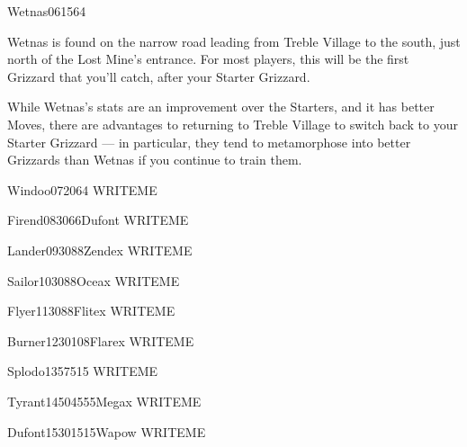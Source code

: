 \documentclass[10pt,twocolumn]{memoir}
\begin{document}
\begin{grizzardpage}{Wetnas}{06}{15}{6}{4}{}

Wetnas is  found on the narrow  road leading from Treble  Village to the
south, just  north of the Lost  Mine's entrance. For most  players, this
will   be   the  first   Grizzard   that   you'll  catch,   after   your
Starter Grizzard.

While Wetnas's  stats are an improvement  over the Starters, and  it has
better Moves,  there are  advantages to returning  to Treble  Village to
switch  back to  your Starter  Grizzard —  in particular,  they tend  to
metamorphose  into  better Grizzards  than  Wetnas  if you  continue  to
train them.
  
\end{grizzardpage}

\begin{grizzardpage}{Windoo}{07}{20}{6}{4}{}
  WRITEME
\end{grizzardpage}

\begin{grizzardpage}{Firend}{08}{30}66{Dufont}
  WRITEME
\end{grizzardpage}

\begin{grizzardpage}{Lander}{09}{30}88{Zendex}
  WRITEME
\end{grizzardpage}

\begin{grizzardpage}{Sailor}{10}{30}88{Oceax}
  WRITEME
\end{grizzardpage}

\begin{grizzardpage}{Flyer}{11}{30}88{Flitex}
  WRITEME
\end{grizzardpage}

\begin{grizzardpage}{Burner}{12}{30}{10}{8}{Flarex}
  WRITEME
\end{grizzardpage}

\begin{grizzardpage}{Splodo}{13}{5}{75}{15}{}
  WRITEME
\end{grizzardpage}

\begin{grizzardpage}{Tyrant}{14}{50}{45}{55}{Megax}
  WRITEME
\end{grizzardpage}

\begin{grizzardpage}{Dufont}{15}{30}{15}{15}{Wapow}
  WRITEME
\end{grizzardpage}
\end{document}
